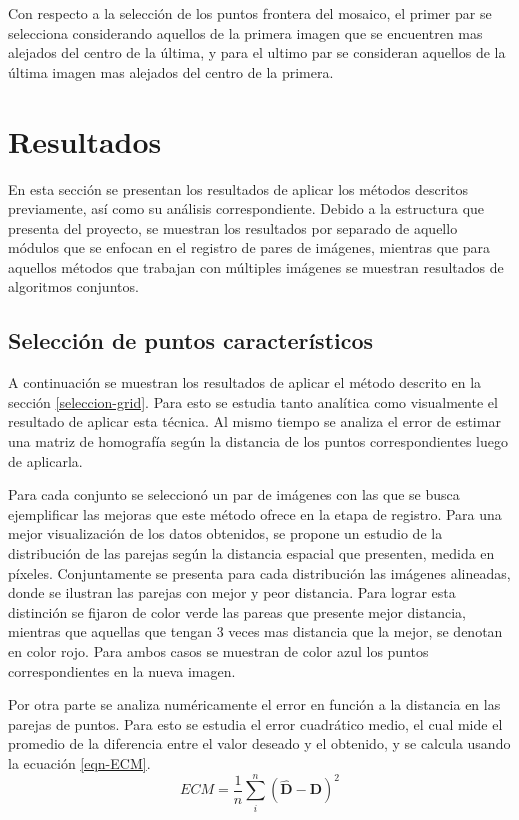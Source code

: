 Con respecto  a la selección de los puntos frontera del mosaico, el primer par se selecciona considerando aquellos de la primera imagen que se encuentren mas alejados del centro de la última, y para el ultimo par se consideran aquellos de la última imagen mas alejados del centro de la primera.

\section{Resultados}

En esta sección se presentan los resultados de aplicar los métodos descritos previamente, así como su análisis correspondiente. Debido a la estructura que presenta del proyecto, se muestran los resultados por separado de aquello módulos que se enfocan en el registro de pares de imágenes, mientras que para aquellos métodos que trabajan con múltiples imágenes se muestran resultados de algoritmos conjuntos.

\subsection*{Selección de puntos característicos}

A continuación se muestran los resultados de aplicar el método descrito en la 
sección \ref{seleccion-grid}. Para esto se estudia tanto analítica como visualmente el resultado de aplicar esta técnica. Al mismo tiempo se analiza el error de estimar una matriz de homografía según la distancia de los puntos correspondientes luego de aplicarla. 

Para cada conjunto se seleccionó un par de imágenes con las que se busca ejemplificar las mejoras que este método ofrece en la etapa de registro. Para una mejor visualización de los datos obtenidos, se propone un estudio de la distribución de las parejas según la distancia espacial que presenten, medida en píxeles. Conjuntamente se presenta para cada distribución las imágenes alineadas, donde se ilustran las parejas con mejor y peor distancia. Para lograr esta distinción se fijaron de color verde las pareas que presente mejor distancia, mientras que aquellas que tengan 3 veces mas distancia que la mejor, se denotan en color rojo. Para ambos casos se muestran de color azul los puntos correspondientes en la nueva imagen.

Por otra parte se analiza numéricamente el error en función a la distancia en las parejas de puntos. Para esto se estudia el error cuadrático medio, el cual mide el promedio de la diferencia entre el valor deseado y el obtenido, y se calcula usando la ecuación \ref{eqn-ECM}.
\begin{equation}\label{eqn-ECM}
	ECM = \frac{1}{n} \sum_{i}^{n} \left( \hat{\mathbf{D}} - \mathbf{D} \right)^2
\end{equation}

